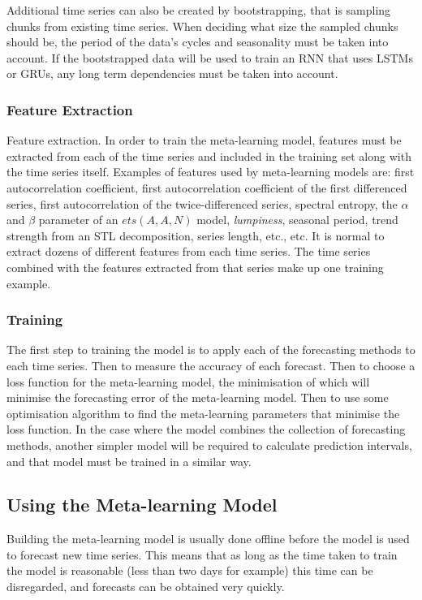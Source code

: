 \documentclass[a4paper,12pt]{article}
\theoremstyle{definition}
\begin{document}
Additional time series can also be created by bootstrapping, that is sampling chunks from existing time series. When deciding what size the sampled chunks should be, the period of the data's cycles and seasonality must be taken into account. If the bootstrapped data will be used to train an RNN that uses LSTMs or GRUs, any long term dependencies must be taken into account.

\subsubsection{Feature Extraction}\label{sec:features}
Feature extraction. In order to train the meta-learning model, features must be extracted from each of the time series and included in the training set along with the time series itself. Examples of features used by meta-learning models are: first autocorrelation coefficient, first autocorrelation coefficient of the first differenced series, first autocorrelation of the twice-differenced series, spectral entropy, the $\alpha$ and $\beta$ parameter of an $ets(A,A,N)$ model, \textit{lumpiness}, seasonal period, trend strength from an STL decomposition, series length, etc., etc. It is normal to extract dozens of different features from each time series. The time series combined with the features extracted from that series make up one training example.

\subsubsection{Training}
The first step to training the model is to apply each of the forecasting methods to each time series. Then to measure the accuracy of each forecast. Then to choose a loss function for the meta-learning model, the minimisation of which will minimise the forecasting error of the meta-learning model. Then to use some optimisation algorithm to find the meta-learning parameters that minimise the loss function. In the case where the model combines the collection of forecasting methods, another simpler model will be required to calculate prediction intervals,  and that model must be trained in a similar way.

\subsection{Using the Meta-learning Model}
Building the meta-learning model is usually done offline before the model is used to forecast new time series. This means that as long as the time taken to train the model is reasonable (less than two days for example) this time can be disregarded, and forecasts can be obtained very quickly. 
\end{document}
